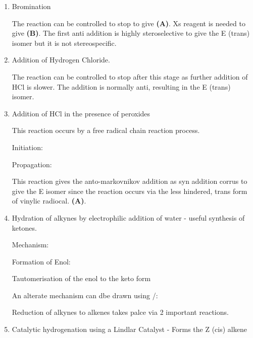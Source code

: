 \begin{enumerate}[label=\alph*)]

  \item Bromination


    The reaction can be controlled to stop to give \textbf{(A)}. Xs reagent is needed
    to give \textbf{(B)}. The first anti addition is highly steroselective to give
    the E (trans) isomer but it is not stereospecific.

  \item Addition of Hydrogen Chloride.


    The reaction can be controlled to stop after this stage as further addition
    of HCl is slower. The addition is normally anti, resulting in the E (trans)
    isomer.

  \item Addition of HCl in the presence of peroxides


    This reaction occurs by a free radical chain reaction process.

    Initiation:


    Propagation:


    This reaction gives the anto-markovnikov addition as syn addition corrus to give the E isomer since the reaction occurs via the less hindered, trans form of
    vinylic radiocal. \textbf{(A)}.



  \item Hydration of alkynes by electrophilic addition of water
    - useful synthesis of ketones.


    Mechanism:

    Formation of Enol:


    Tautomerisation of the enol to the keto form


    An alterate mechanism can dbe drawn using /:


    Reduction of alkynes to alkenes takes palce via 2 important reactions.

  \item Catalytic hydrogenation using a Lindlar Catalyst - Forms the Z (cis) alkene


\end{enumerate}

